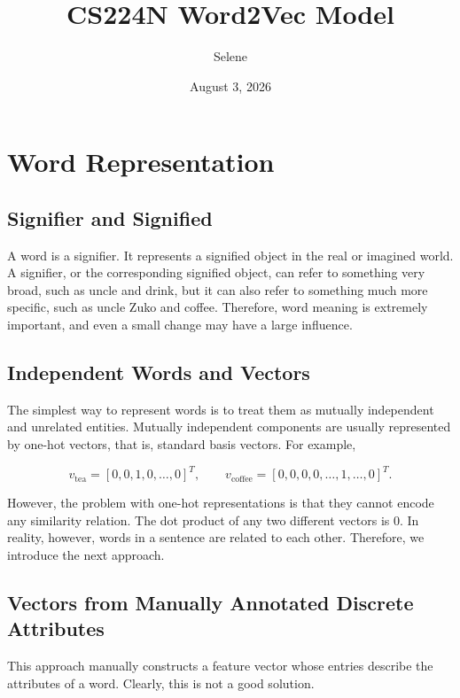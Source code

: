 \documentclass[
  a4paper,
  10pt]{article}
\title{CS224N \textbar{} Word2Vec Model}
\author{Selene}
\date{August 3, 2026}
\begin{document}
\maketitle

\section{Word Representation}\label{word-representation}

\subsection{Signifier and Signified}\label{signifier-and-signified}

A word is a signifier. It represents a signified object in the real or
imagined world. A signifier, or the corresponding signified object, can
refer to something very broad, such as uncle and drink, but it can also
refer to something much more specific, such as uncle Zuko and coffee.
Therefore, word meaning is extremely important, and even a small change
may have a large influence.

\subsection{Independent Words and
Vectors}\label{independent-words-and-vectors}

The simplest way to represent words is to treat them as mutually
independent and unrelated entities. Mutually independent components are
usually represented by one-hot vectors, that is, standard basis vectors.
For example,

\[
v_{\mathrm{tea}}=[0,0,1,0,\ldots,0]^T,
\qquad
v_{\mathrm{coffee}}=[0,0,0,0,\ldots,1,\ldots,0]^T.
\]

However, the problem with one-hot representations is that they cannot
encode any similarity relation. The dot product of any two different
vectors is \(0\). In reality, however, words in a sentence are related
to each other. Therefore, we introduce the next approach.

\subsection{Vectors from Manually Annotated Discrete
Attributes}\label{vectors-from-manually-annotated-discrete-attributes}

This approach manually constructs a feature vector whose entries
describe the attributes of a word. Clearly, this is not a good solution.
\end{document}
